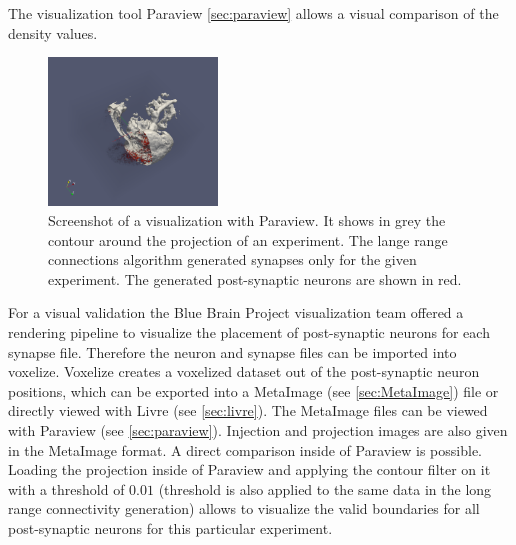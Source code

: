 The visualization tool Paraview \ref{sec:paraview} allows a visual comparison of the density values.
 \begin{figure}[ht!]
\centering
\includegraphics[width=0.4\textwidth]{pictures/paraview_ex.png}
\caption{Screenshot of a visualization with Paraview. It shows in grey the contour around the projection of an experiment.
The lange range connections algorithm generated synapses only for the given experiment. 
The generated post-synaptic neurons are shown in red.}
\label{fig:paraviewex}
\end{figure}
For a visual validation the Blue Brain Project visualization team offered a rendering pipeline to visualize the placement of post-synaptic neurons for each synapse file. Therefore the neuron and synapse files can be imported into 
voxelize. Voxelize creates a voxelized dataset out of the post-synaptic neuron positions, which can be exported into
a MetaImage (see \ref{sec:MetaImage}) file or directly viewed with Livre (see \ref{sec:livre}).
The MetaImage files can be viewed with Paraview (see \ref{sec:paraview}).
Injection and projection images are also given in the MetaImage format.
A direct comparison inside of Paraview is possible.
Loading the projection inside of Paraview and applying the contour filter on it with a threshold of $0.01$ (threshold is also applied to the same data in the long range connectivity generation) allows to visualize the valid boundaries for all post-synaptic neurons for this particular experiment.
 
